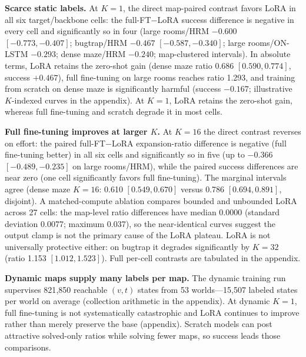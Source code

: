 \documentclass[letterpaper]{article} %
\begin{document}
\textbf{Scarce static labels.} At $K{=}1$, the direct map-paired contrast favors LoRA in all six target/backbone cells: the full-FT$-$LoRA success difference is negative in every cell and significantly so in four (large rooms/HRM $-0.600$ $[-0.773,-0.407]$; bugtrap/HRM $-0.467$ $[-0.587,-0.340]$; large rooms/ON-LSTM $-0.293$; dense maze/HRM $-0.240$; map-clustered intervals). In absolute terms, LoRA retains the zero-shot gain (dense maze ratio 0.686 $[0.590,0.774]$, success $+0.467$), full fine-tuning on large rooms reaches ratio 1.293, and training from scratch on dense maze is significantly harmful (success $-0.167$; illustrative $K$-indexed curves in the appendix). At $K{=}1$, LoRA retains the zero-shot gain, whereas full fine-tuning and scratch degrade it in most cells.

\textbf{Full fine-tuning improves at larger $K$.} At $K{=}16$ the direct contrast reverses on effort: the paired full-FT$-$LoRA expansion-ratio difference is negative (full fine-tuning better) in all six cells and significantly so in five (up to $-0.366$ $[-0.489,-0.235]$ on large rooms/HRM), while the paired success differences are near zero (one cell significantly favors full fine-tuning). The marginal intervals agree (dense maze $K{=}16$: 0.610 $[0.549,0.670]$ versus 0.786 $[0.694,0.891]$, disjoint). A matched-compute ablation compares bounded and unbounded LoRA across 27 cells: the map-level ratio differences have median 0.0000 (standard deviation 0.0077; maximum 0.037), so the near-identical curves suggest the output clamp is not the primary cause of the LoRA plateau. LoRA is not universally protective either: on bugtrap it degrades significantly by $K{=}32$ (ratio 1.153 $[1.012,1.523]$). Full per-cell contrasts are tabulated in the appendix.

\textbf{Dynamic maps supply many labels per map.} The dynamic training run supervises 821{,}850 reachable $(v,t)$ states from 53 worlds---15{,}507 labeled states per world on average (collection arithmetic in the appendix). At dynamic $K{=}1$, full fine-tuning is not systematically catastrophic and LoRA continues to improve rather than merely preserve the base (appendix). Scratch models can post attractive solved-only ratios while solving fewer maps, so success leads those comparisons.
\end{document}
